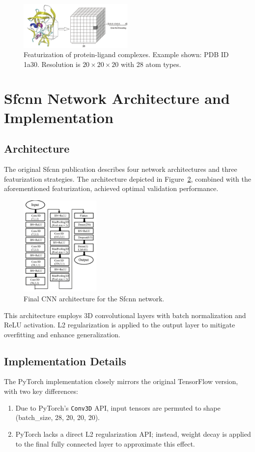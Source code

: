 \documentclass[unnumsec,webpdf,contemporary,large]{oup-authoring-template}
\theoremstyle{thmstyleone}%
\theoremstyle{thmstyletwo}%
\theoremstyle{thmstylethree}%
\begin{document}
\begin{figure}[H]
    \centering
    \includegraphics[width=0.5\textwidth]{images/one_hot.png}
    \caption{Featurization of protein-ligand complexes. Example shown: PDB ID 1a30. Resolution is $20 \times 20 \times20$ with 28 atom types.}
    \label{fig:onehot}
\end{figure}

\section{Sfcnn Network Architecture and Implementation}

\subsection{Architecture}
The original Sfcnn publication describes four network architectures and three featurization strategies. The architecture depicted in Figure~\ref{fig:CNN}, combined with the aforementioned featurization, achieved optimal validation performance.

\begin{figure}[H]
    \centering
    \includegraphics[width=0.35\textwidth]{images/CNN.png}
    \caption{Final CNN architecture for the Sfcnn network.}
    \label{fig:CNN}
\end{figure}

This architecture employs 3D convolutional layers with batch normalization and ReLU activation. L2 regularization is applied to the output layer to mitigate overfitting and enhance generalization.

\subsection{Implementation Details}
The PyTorch implementation closely mirrors the original TensorFlow version, with two key differences:
\begin{enumerate}
    \item Due to PyTorch's \texttt{Conv3D} API, input tensors are permuted to shape (batch\_size, 28, 20, 20, 20).
    \item PyTorch lacks a direct L2 regularization API; instead, weight decay is applied to the final fully connected layer to approximate this effect.
\end{enumerate}
\end{document}
